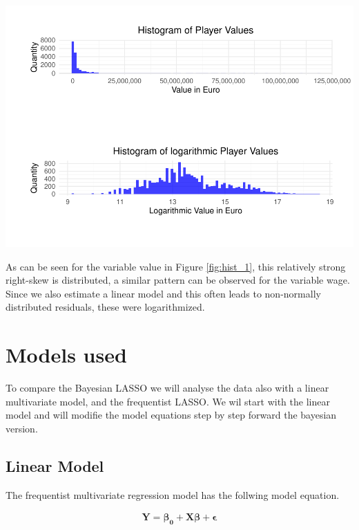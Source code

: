 \documentclass[12pt,a4paper]{article}
\let\origfigure\figure
\let\endorigfigure\endfigure
\renewenvironment{figure}[1][2] {
    \expandafter\origfigure\expandafter[H]
} {
    \endorigfigure
}
\begin{document}
\begin{figure}
\centering
\includegraphics{term_paper_bayes_files/figure-latex/fig1-1.pdf}
\caption{\label{fig:hist_1} Histograms of player values and log player
values}
\end{figure}

As can be seen for the variable value in Figure \ref{fig:hist_1}, this
relatively strong right-skew is distributed, a similar pattern can be
observed for the variable wage. Since we also estimate a linear model
and this often leads to non-normally distributed residuals, these were
logarithmized.

\newpage

\hypertarget{models-used}{%
\section{Models used}\label{models-used}}

To compare the Bayesian \ac{LASSO} we will analyse the data also with a
linear multivariate model, and the frequentist \ac{LASSO}. We wil start
with the linear model and will modifie the model equations step by step
forward the bayesian version.

\hypertarget{linear-model}{%
\subsection{Linear Model}\label{linear-model}}

The frequentist multivariate regression model has the follwing model
equation.

\begin{align}
\label{eq:lm}
\pmb{Y = \beta_0 + X \beta} + \pmb{\epsilon}
\end{align}
\end{document}
